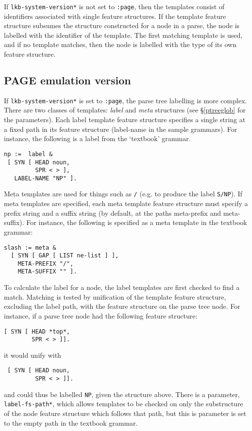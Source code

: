 \documentclass[12pt]{report}
\begin{document}
If {\tt *lkb-system-version*} is not set to 
{\tt :page}, then the templates consist of identifiers 
associated with single feature
structures.  If the template feature structure subsumes the structure
constructed for a node in a parse, the node is labelled with the identifier
of the template.
The first matching template is used, and if no template matches,
then the node is labelled with the type of its own feature structure.

\subsection{PAGE emulation version}
If {\tt *lkb-system-version*} is set to 
{\tt :page}, the parse tree labelling is more complex.
There are two classes of templates: {\it label} and {\it meta}
structures (see \S\ref{ptreeglob} for the parameters).
Each label template feature structure specifies 
a single string at a fixed path in
its feature structure ({\sc label-name} in the sample grammars).
For instance, the following is a label from the `textbook' grammar.
\begin{verbatim}
np :=  label &
 [ SYN [ HEAD noun,
         SPR < > ],
   LABEL-NAME "NP" ].
\end{verbatim}
Meta templates are used for things such as {\tt /} (e.g. to produce
the label {\tt S/NP}).
If meta templates are specified,
each meta template feature structure must
specify a prefix string and a suffix string
(by default, at the paths {\sc meta-prefix} and {\sc meta-suffix}).  
For instance, the following is specified as a meta template in the textbook
grammar:
\begin{verbatim}
slash := meta &
  [ SYN [ GAP [ LIST ne-list ] ],
    META-PREFIX "/",
    META-SUFFIX "" ].
\end{verbatim}

To calculate the label for a 
node, the label templates are first checked to find a match.
Matching is tested by unification of the template feature
structure, excluding the label path, with the feature structure
on the parse tree node.
For instance, if a parse tree node had the following feature structure:
\begin{verbatim}
[ SYN [ HEAD *top*,
        SPR < > ]].
\end{verbatim}
it would unify with
\begin{verbatim}
 [ SYN [ HEAD noun,
         SPR < > ]].
\end{verbatim}
and could thus be labelled {\tt NP}, given the structure above.
There is a parameter, {\tt *label-fs-path*}, which allows
templates to be checked on only the substructure of the node
feature structure which follows that path, but
this is parameter is set to the empty path in the textbook grammar. 
\end{document}
